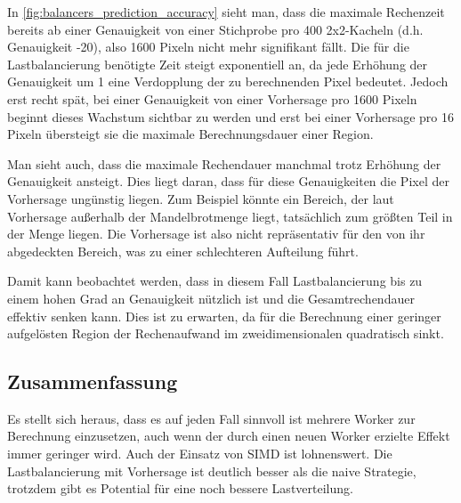 In \autoref{fig:balancers_prediction_accuracy} sieht man, dass die maximale Rechenzeit bereits ab einer Genauigkeit von
einer Stichprobe pro 400 2x2-Kacheln (d.h. Genauigkeit -20), also 1600 Pixeln nicht mehr signifikant fällt.
Die für die Lastbalancierung benötigte Zeit steigt exponentiell an, da jede Erhöhung der Genauigkeit um 1 eine Verdopplung der zu berechnenden Pixel bedeutet.
Jedoch erst recht spät, bei einer Genauigkeit von einer Vorhersage pro 1600 Pixeln beginnt dieses Wachstum sichtbar zu werden
und erst bei einer Vorhersage pro 16 Pixeln übersteigt sie die maximale Berechnungsdauer einer Region.

Man sieht auch, dass die maximale Rechendauer manchmal trotz Erhöhung der Genauigkeit ansteigt.
Dies liegt daran, dass für diese Genauigkeiten die Pixel der Vorhersage ungünstig liegen.
Zum Beispiel könnte ein Bereich, der laut Vorhersage außerhalb der Mandelbrotmenge liegt, tatsächlich zum größten Teil in der Menge liegen.
Die Vorhersage ist also nicht repräsentativ für den von ihr abgedeckten Bereich, was zu einer schlechteren Aufteilung führt.

Damit kann beobachtet werden, dass in diesem Fall Lastbalancierung bis zu einem hohen Grad an Genauigkeit nützlich ist
und die Gesamtrechendauer effektiv senken kann.
Dies ist zu erwarten, da für die Berechnung einer geringer aufgelösten Region
der Rechenaufwand im zweidimensionalen quadratisch sinkt.

%

\subsection{Zusammenfassung}


Es stellt sich heraus, dass es auf jeden Fall sinnvoll ist mehrere Worker zur Berechnung einzusetzen, auch wenn der durch einen neuen Worker erzielte Effekt immer geringer wird.
Auch der Einsatz von SIMD ist lohnenswert. %
Die Lastbalancierung mit Vorhersage ist deutlich besser als die naive Strategie, trotzdem gibt es Potential für eine noch bessere Lastverteilung.